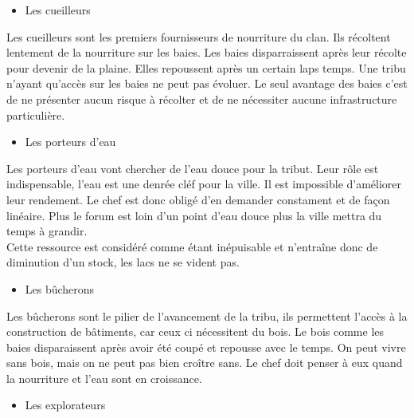 \documentclass[12pt]{article}
\begin{document}
\begin{itemize}
		\begin{itemize}
		\item Les cueilleurs\\
		\end{itemize}
		
Les cueilleurs sont les premiers fournisseurs de nourriture du clan. Ils 
récoltent lentement de la nourriture sur les baies. Les baies disparraissent 
après leur récolte pour devenir de la plaine. Elles repoussent après un 
certain laps temps. Une tribu n'ayant qu'accès sur les baies ne peut pas 
évoluer. Le seul avantage des baies c'est de ne présenter aucun risque à 
récolter et de ne nécessiter aucune infrastructure particulière.\\ 

		\begin{itemize}
		\item Les porteurs d'eau\\
		\end{itemize}
		
Les porteurs d'eau vont chercher de l'eau douce pour la tribut. Leur rôle est 
indispensable, l'eau est une denrée cléf pour la ville. Il est impossible 
d'améliorer leur rendement. Le chef est donc obligé d'en demander constament 
et de façon linéaire. Plus le forum est loin d'un point d'eau douce plus la 
ville mettra du temps à grandir.\\

Cette ressource est considéré comme étant inépuisable et n'entraîne donc de 
diminution d'un stock, les lacs ne se vident pas.\\

		\begin{itemize}
		\item Les bûcherons\\
		\end{itemize}

Les bûcherons sont le pilier de l'avancement de la tribu, ils permettent  
l'accès à la construction de bâtiments, car ceux ci nécessitent du bois. Le 
bois comme les baies disparaissent après avoir été coupé et repousse avec le 
temps. On peut vivre sans bois, mais on ne peut pas bien croître sans. Le chef 
doit penser à eux quand la nourriture et l'eau sont en croissance.\\

		\begin{itemize}
		\item Les explorateurs\\
		\end{itemize}
		

\end{itemize}
\end{document}
